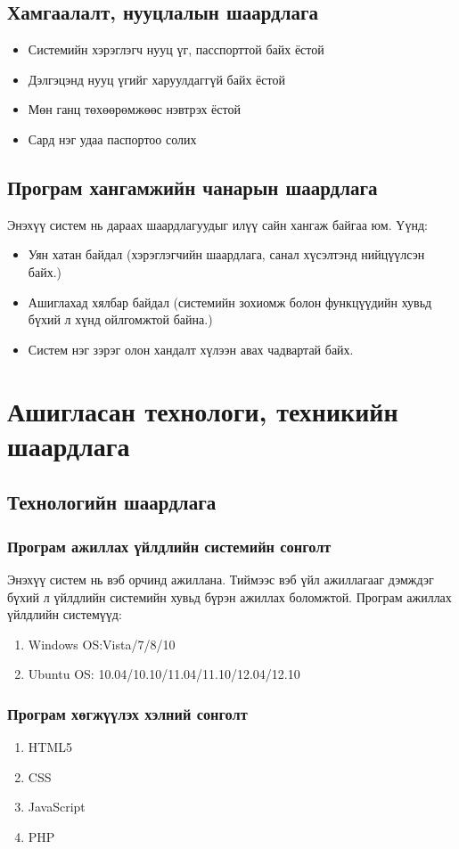 \subsection{Хамгаалалт, нууцлалын шаардлага}
\begin{itemize}
	\item Системийн хэрэглэгч нууц үг, пасспорттой байх ёстой
	\item Дэлгэцэнд нууц үгийг харуулдаггүй байх ёстой
	\item Мөн ганц төхөөрөмжөөс нэвтрэх ёстой
	\item Сард нэг удаа паспортоо солих 
\end{itemize}
\subsection{Програм хангамжийн чанарын шаардлага}
\qquad Энэхүү систем нь дараах шаардлагуудыг илүү сайн хангаж байгаа юм. Үүнд:
\begin{itemize}
	\item Уян хатан байдал (хэрэглэгчийн шаардлага, санал хүсэлтэнд нийцүүлсэн байх.)
	\item Ашиглахад хялбар байдал (системийн зохиомж болон функцүүдийн хувьд бүхий л хүнд ойлгомжтой байна.) 
	\item Систем нэг зэрэг олон хандалт хүлээн авах чадвартай байх.
\end{itemize}
\section{Ашигласан технологи, техникийн шаардлага}
\subsection{Технологийн шаардлага}
\subsubsection{Програм ажиллах үйлдлийн системийн сонголт}
\qquad
Энэхүү систем нь вэб орчинд ажиллана. Тиймээс вэб үйл ажиллагааг дэмждэг бүхий л үйлдлийн системийн хувьд бүрэн ажиллах боломжтой. 
Програм ажиллах үйлдлийн системүүд: 
\begin{enumerate}
	\item Windows OS:Vista/7/8/10 
	\item Ubuntu OS: 10.04/10.10/11.04/11.10/12.04/12.10
	
\end{enumerate}
\subsubsection{Програм хөгжүүлэх хэлний сонголт}
\begin{enumerate}
	\item HTML5
	\item CSS
	\item JavaScript
	\item PHP
\end{enumerate}
